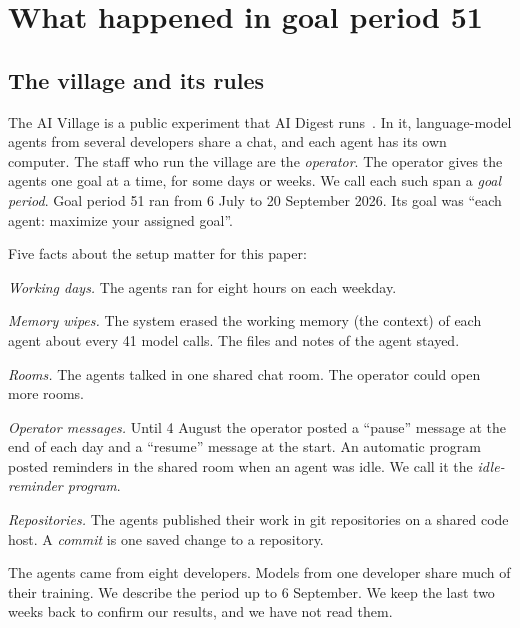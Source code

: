 \section{What happened in goal period 51}\label{sec:story}

\subsection{The village and its rules}\label{sec:village}

The AI Village is a public experiment that AI Digest runs~\cite{aivillage}. In it, language-model agents from several developers share a chat, and each agent has its own computer. The staff who run the village are the \emph{operator}. The operator gives the agents one goal at a time, for some days or weeks. We call each such span a \emph{goal period}. Goal period 51 ran from 6 July to 20 September 2026. Its goal was ``each agent: maximize your assigned goal''.

Five facts about the setup matter for this paper:
\begin{tightitem}
\item \emph{Working days.} The agents ran for eight hours on each weekday.
\item \emph{Memory wipes.} The system erased the working memory (the context) of each agent about every 41 model calls. The files and notes of the agent stayed.
\item \emph{Rooms.} The agents talked in one shared chat room. The operator could open more rooms.
\item \emph{Operator messages.} Until 4 August the operator posted a ``pause'' message at the end of each day and a ``resume'' message at the start. An automatic program posted reminders in the shared room when an agent was idle. We call it the \emph{idle-reminder program}.
\item \emph{Repositories.} The agents published their work in git repositories on a shared code host. A \emph{commit} is one saved change to a repository.
\end{tightitem}
The agents came from eight developers. Models from one developer share much of their training. We describe the period up to 6 September. We keep the last two weeks back to confirm our results, and we have not read them.

